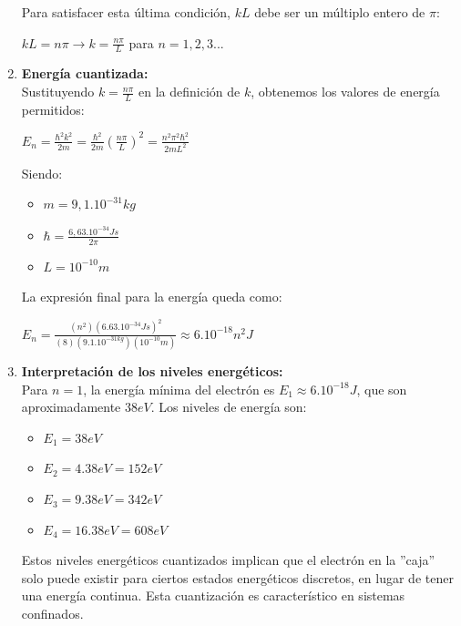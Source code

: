 \documentclass[a4paper]{article}
\begin{document}
\begin{enumerate}
				Para satisfacer esta última condición, $kL$ debe ser un múltiplo entero de $\pi$:

				\begin{center}
					$kL = n \pi \rightarrow k = \frac{n \pi}{L}$ \hspace{5mm} para $n = 1,2,3...$
				\end{center}

			\item \indent \textbf{Energía cuantizada:} \\
				Sustituyendo $k = \frac{n \pi}{L}$ en la definición de $k$, obtenemos los valores de energía permitidos:

				\begin{center}
					$E_n = \frac{\hbar ^2 k^2}{2m} = \frac{\hbar ^2}{2m} (\frac{n \pi}{L})^2 = \frac{n^2 \pi^2 \hbar^2}{2mL^2}$
				\end{center}

				Siendo:

				\begin{itemize}
					\item $m = 9,1 . 10^{-31} kg$
					\item $\hbar = \frac {6,63 . 10^{-34} Js}{2 \pi}$
					\item $L = 10^{-10}m$
				\end{itemize}

				La expresión final para la energía queda como:

				\begin{center}
					$E_n = \frac {(n^2)(6.63 . 10^{-34} Js)^2}{(8)(9.1 . 10^{-31 kg}) (10^{-10}m)} \approx 6 . 10^{-18}n^2 J$
				\end{center}

			\item \indent \textbf{Interpretación de los niveles energéticos:} \\
				Para $n = 1$, la energía mínima del electrón es $E_1 \approx 6 . 10^{-18} J$, que son aproximadamente $38eV$. Los niveles de energía son: 

				\begin{itemize}
					\item $E_1 = 38eV$
					\item $E_2 = 4 . 38eV = 152 eV$
					\item $E_3 = 9 . 38eV = 342 eV$
					\item $E_4 = 16 . 38eV = 608 eV$
				\end{itemize}

				Estos niveles energéticos cuantizados implican que el electrón en la ''caja'' solo puede existir para ciertos estados energéticos discretos, en lugar de tener una energía continua. Esta cuantización es característico en sistemas confinados.

	\end{enumerate}
\end{document}
